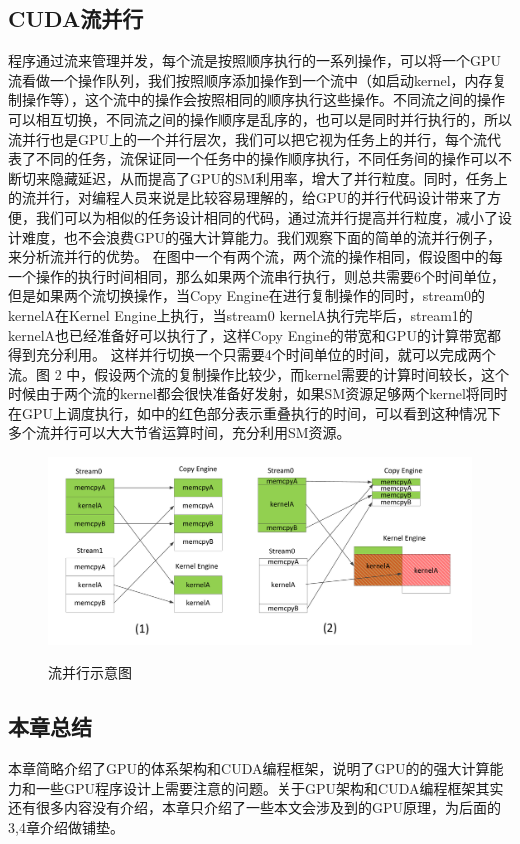 \subsection{CUDA流并行}
程序通过流来管理并发，每个流是按照顺序执行的一系列操作，可以将一个GPU流看做一个操作队列，我们按照顺序添加操作到一个流中（如启动kernel，内存复制操作等），这个流中的操作会按照相同的顺序执行这些操作。不同流之间的操作可以相互切换，不同流之间的操作顺序是乱序的，也可以是同时并行执行的，所以流并行也是GPU上的一个并行层次，我们可以把它视为任务上的并行，每个流代表了不同的任务，流保证同一个任务中的操作顺序执行，不同任务间的操作可以不断切来隐藏延迟，从而提高了GPU的SM利用率，增大了并行粒度。同时，任务上的流并行，对编程人员来说是比较容易理解的，给GPU的并行代码设计带来了方便，我们可以为相似的任务设计相同的代码，通过流并行提高并行粒度，减小了设计难度，也不会浪费GPU的强大计算能力。我们观察下面的简单的流并行例子，来分析流并行的优势。
在图中一个有两个流，两个流的操作相同，假设图中的每一个操作的执行时间相同，那么如果两个流串行执行，则总共需要6个时间单位，但是如果两个流切换操作，当Copy Engine在进行复制操作的同时，stream0的kernelA在Kernel Engine上执行，当stream0 kernelA执行完毕后，stream1的kernelA也已经准备好可以执行了，这样Copy Engine的带宽和GPU的计算带宽都得到充分利用。
这样并行切换一个只需要4个时间单位的时间，就可以完成两个流。图 2 中，假设两个流的复制操作比较少，而kernel需要的计算时间较长，这个时候由于两个流的kernel都会很快准备好发射，如果SM资源足够两个kernel将同时在GPU上调度执行，如中的红色部分表示重叠执行的时间，可以看到这种情况下多个流并行可以大大节省运算时间，充分利用SM资源。
\begin{figure}
\setlength{\belowcaptionskip}{-0.5cm}
  \begin{center}
    {\includegraphics[width=1 \textwidth]{figures/flow.pdf}}
    \end{center}
  \caption{{\footnotesize{流并行示意图}}}
  \label{flow}
\end{figure}
\subsection{本章总结}
本章简略介绍了GPU的体系架构和CUDA编程框架，说明了GPU的的强大计算能力和一些GPU程序设计上需要注意的问题。关于GPU架构和CUDA编程框架其实还有很多内容没有介绍，本章只介绍了一些本文会涉及到的GPU原理，为后面的3,4章介绍做铺垫。